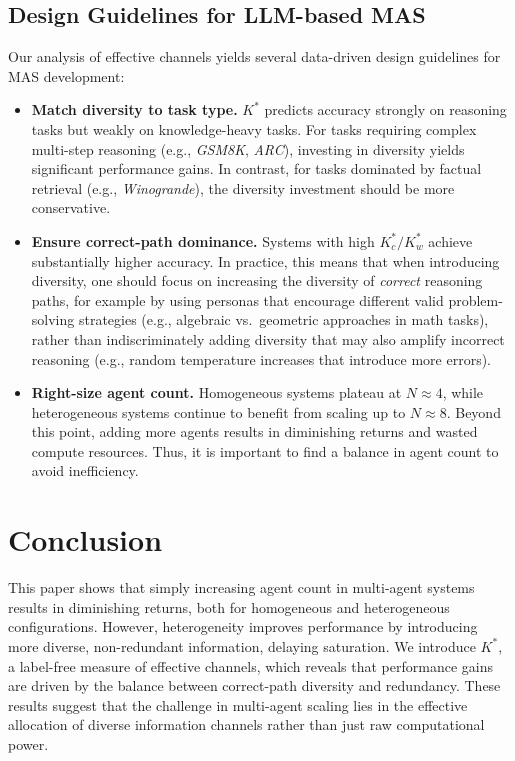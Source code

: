 \documentclass{article}
\theoremstyle{plain}
\theoremstyle{definition}
\theoremstyle{remark}
\begin{document}
\subsection{Design Guidelines for LLM-based MAS}
\label{sec:design_guidelines}
Our analysis of effective channels yields several data-driven design guidelines for MAS development:
\vspace{-0.2cm}
\begin{itemize}[leftmargin=2em] 
\setlength{\itemsep}{-0.2em}
    \item \textbf{Match diversity to task type.}  
    $K^*$ predicts accuracy strongly on reasoning tasks but weakly on knowledge-heavy tasks. For tasks requiring complex multi-step reasoning (e.g., \textit{GSM8K}, \textit{ARC}), investing in diversity yields significant performance gains. In contrast, for tasks dominated by factual retrieval (e.g., \textit{Winogrande}), the diversity investment should be more conservative.
    \item \textbf{Ensure correct-path dominance.}
    Systems with high \( K^*_c / K^*_w \) achieve substantially higher accuracy. In practice, this means that when introducing diversity, one should focus on increasing the diversity of \emph{correct} reasoning paths, for example by using personas that encourage different valid problem-solving strategies (e.g., algebraic vs.\ geometric approaches in math tasks), rather than indiscriminately adding diversity that may also amplify incorrect reasoning (e.g., random temperature increases that introduce more errors).
    \item \textbf{Right-size agent count.}  
    Homogeneous systems plateau at \(N \approx 4\), while heterogeneous systems continue to benefit from scaling up to \(N \approx 8\). Beyond this point, adding more agents results in diminishing returns and wasted compute resources. Thus, it is important to find a balance in agent count to avoid inefficiency.
\end{itemize}

\section{Conclusion}

This paper shows that simply increasing agent count in multi-agent systems results in diminishing returns, both for homogeneous and heterogeneous configurations. However, heterogeneity improves performance by introducing more diverse, non-redundant information, delaying saturation. We introduce \(K^*\), a label-free measure of effective channels, which reveals that performance gains are driven by the balance between correct-path diversity and redundancy. These results suggest that the challenge in multi-agent scaling lies in the effective allocation of diverse information channels rather than just raw computational power.
\end{document}
